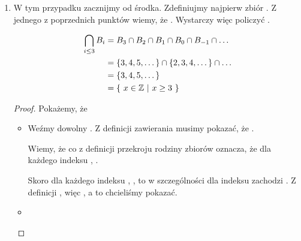 \begin{example}
\begin{enumerate}
\begin{proof}
\begin{itemize}
        Weźmy więc dowolny indeks .  jest zbiorem  kolejnych elementów, począwszy od . To znaczy . Skoro , to .
    \end{itemize}
    \end{proof}
    
    \item {}
    
    W tym przypadku zacznijmy od środka. Zdefiniujmy najpierw zbiór . Z jednego z poprzednich punktów wiemy, że . Wystarczy więc policzyć .
    
    \[
        \begin{split}
            \bigcap\limits_{i \leq 3} B_i
            &= B_3 \cap B_2 \cap B_1 \cap B_0 \cap B_{-1} \cap \dots 
            \\&= \{ 3,4,5,\dots \} \cap \{ 2,3,4,\dots \} \cap \dots
            \\&= \{3,4,5,\dots \}
            \\&= \{\ x \in \mathbb{Z}\ |\ x \geq 3\ \}
        \end{split}
    \]
    
    \begin{proof}
    Pokażemy, że 
    \begin{itemize}
        \item  {}
        
        Weźmy dowolny . Z definicji zawierania musimy pokazać, że . 
        
        Wiemy, że  co z definicji przekroju rodziny zbiorów oznacza, że dla każdego indeksu , .
        
        Skoro dla każdego indeksu , , to w szczególności dla indeksu  zachodzi . Z definicji , więc , a to chcieliśmy pokazać.
        
        \item {}
        

\end{itemize}
\end{proof}
\end{enumerate}
\end{example}
